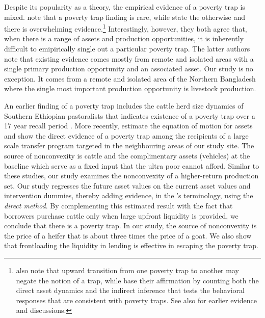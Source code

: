 	Despite its popularity as a theory, the empirical evidence of a poverty trap is mixed. \citet{KraayMcKenzie2014} note that a poverty trap finding is rare, while \citet{BarrettGargMcBride2016} state the otherwise and there is overwhelming evidence.\footnote{\citet{KraayMcKenzie2014} also note that upward transition from one poverty trap to another may negate the notion of a trap, while \citet{BarrettGargMcBride2016} base their affirmation by counting both the direct asset dynamics and the indirect inference that tests the behavioral responses that are consistent with poverty traps. See also \citet{CarterBarrett2006, BarrettCarter2013} for earlier evidence and discussions. } Interestingly, however, they both agree that, when there is a range of assets and production opportunities, it is inherently difficult to emipirically single out a particular poverty trap. The latter authors note that existing evidence comes mostly from remote and isolated areas with a single primary production opportunity and an associated asset. Our study is no exception. It comes from a remote and isolated area of the Northern Bangladesh where the single most important production opportunity is livestock production.  
	
	An earlier finding of a poverty trap includes the cattle herd size dynamics of Southern Ethiopian pastoralists that indicates existence of a poverty trap over a 17 year recall period \citep{Lybbertetal2004}. More recently, \citet{Balboni2020} estimate the equation of motion for assets and show the direct evidence of a poverty trap among the recipients of a large scale transfer program targeted in the neighbouring areas of our study site. The source of nonconvexity is cattle and the complimentary assets (vehicles) at the baseline which serve as a fixed input that the ultra poor cannot afford. Similar to these studies, our study examines the nonconvexity of a higher-return production set. Our study regresses the future asset values on the current asset values and intervention dummies, thereby adding evidence, in the \citet{BarrettGargMcBride2016}'s terminology, using the \textit{direct method}. %
	By complementing this estimated result with the fact that borrowers purchase cattle only when large upfront liquidity is provided, we conclude that there is a poverty trap. In our study, the source of nonconvexity is the price of a heifer that is about three times the price of a goat. We also show that frontloading the liquidity in lending is effective in escaping the poverty trap.

